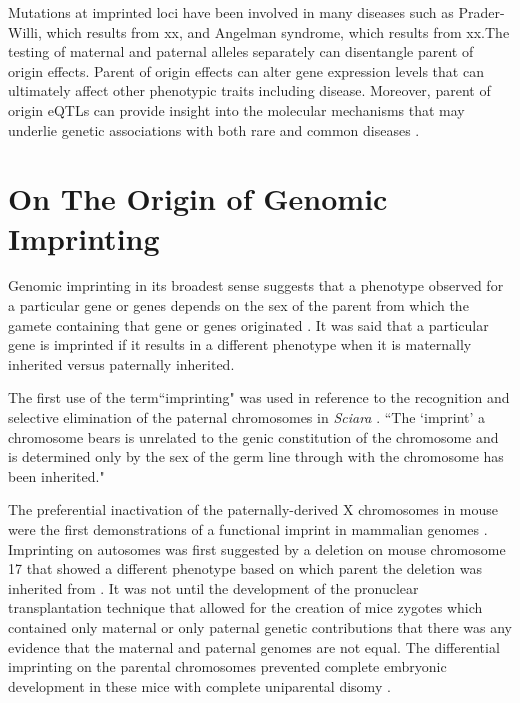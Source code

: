 Mutations at imprinted loci have been involved in many diseases such as Prader-Willi, which results from xx, and Angelman syndrome, which results from xx\cite{Lawson2013,Peters2014}.The testing of maternal and paternal alleles separately can disentangle parent of origin effects. Parent of origin effects can alter gene expression levels that can ultimately affect other phenotypic traits including disease. Moreover, parent of origin eQTLs can provide insight into the molecular mechanisms that may underlie genetic associations with both rare and common diseases \cite{Lawson2013,Peters2014,Kong:2009kk,Stridh2014,Falls1999}.



\section{On The Origin of Genomic Imprinting }

Genomic imprinting in its broadest sense suggests that a phenotype observed for a particular gene or genes depends on the sex of the parent from which the gamete containing that gene or genes originated \cite{Sapienza:1989vm}. It was said that a particular gene is imprinted if it results in a different phenotype when it is maternally inherited versus paternally inherited.

The first use of the term``imprinting" was used in reference to the recognition and selective elimination of the paternal chromosomes in \textit{Sciara} \cite{Crouse:1960vc,Sapienza:1989vm}. ``The `imprint' a chromosome bears is unrelated to the genic constitution of the chromosome and is determined only by the sex of the germ line through with the chromosome has been inherited." \cite{Crouse:1960vc} 

The preferential inactivation of the paternally-derived X chromosomes in mouse were the first demonstrations of a functional imprint in mammalian genomes \cite{Takagi:1975ua,Lyon:1984gh,Chandra:1975tb}. Imprinting on autosomes was first suggested by a deletion on mouse chromosome 17 that showed a different phenotype based on which parent the deletion was inherited from \cite{Johnson:1974uf,Johnson:1974kc}. It was not until the development of the pronuclear transplantation technique that allowed for the creation of mice zygotes which contained only maternal or only paternal genetic contributions that there was any evidence that the maternal and paternal genomes are not equal. The differential imprinting on the parental chromosomes prevented complete embryonic development in these mice with complete uniparental disomy \cite{Sapienza:1989vm,McGrath:1984ky}. 

